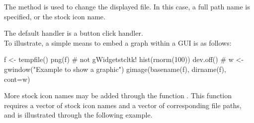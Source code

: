 The  method is used to change the
displayed file. In this case, a full path name is specified, or the
stock icon name.

The default handler is a button click handler.
\\

To illustrate, a simple means to embed a graph within a GUI is as follows:
\begin{Schunk}
\begin{Sinput}
 f <- tempfile()
 png(f)                                  # not gWidgetstcltk!
 hist(rnorm(100))
 dev.off()
 #
 w <- gwindow("Example to show a graphic")
 gimage(basename(f), dirname(f), cont=w)
\end{Sinput}
\end{Schunk}
%

More stock icon names may be added through the function
. This function requires a vector of stock icon
names and a vector of corresponding file paths, and is illustrated
through the following example.


